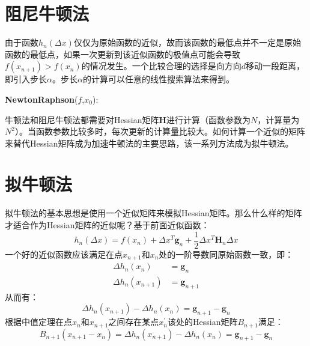 \section{阻尼牛顿法}

由于函数$h_n(\Delta x)$仅仅为原始函数的近似，故而该函数的最低点并不一定是原始函数的最低点，如果一次更新到该近似函数的极值点可能会导致$f(x_{n+1}) > f(x_n)$的情况发生。一个比较合理的选择是向方向$d$移动一段距离，即引入步长$\alpha$。步长$\alpha$的计算可以任意的线性搜索算法来得到。

\begin{minipage}{0.8\textwidth}\centering
\begin{algorithm}[H]
\textbf{NewtonRaphson}($f$,$x_0$):\\
\end{algorithm}
\end{minipage}
 
牛顿法和阻尼牛顿法都需要对Hessian矩阵$\mathbf{H}$进行计算（函数参数为$N$，计算量为$N^2$）。当函数参数比较多时，每次更新的计算量比较大。如何计算一个近似的矩阵来替代Hessian矩阵成为加速牛顿法的主要思路，该一系列方法成为拟牛顿法。

\section{拟牛顿法}
拟牛顿法的基本思想是使用一个近似矩阵来模拟Hessian矩阵。那么什么样的矩阵才适合作为Hessian矩阵的近似呢？基于前面近似函数：
\begin{displaymath}
h_n(\Delta x)=f(x_n)+\Delta x^T\mathbf{g}_n +\frac{1}{2}\Delta x^T \mathbf{H}_n\Delta x
\end{displaymath}
一个好的近似函数应该满足在点$x_{n+1}$和$x_n$处的一阶导数同原始函数一致，即：
\begin{displaymath}
\begin{split}
\Delta h_n(x_n) &= \mathbf{g}_n\\
\Delta h_n(x_{n+1}) &= \mathbf{g}_{n+1}
\end{split}
\end{displaymath}
从而有：
\begin{displaymath}
\Delta h_n(x_{n+1}) -\Delta h_n(x_n) = \mathbf{g}_{n+1} - \mathbf{g}_n
\end{displaymath}
根据中值定理在点$x_n$和$x_{n+1}$之间存在某点$x_n^{'}$该处的Hessian矩阵$B_{n+1}$满足：
\begin{displaymath}
B_{n+1}(x_{n+1} - x_n) = \Delta h_n(x_{n+1}) -\Delta h_n(x_{n})  = \mathbf{g}_{n+1} - \mathbf{g}_n
\end{displaymath}

